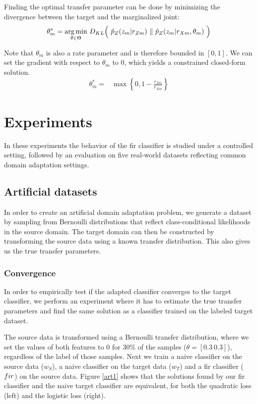 \documentclass[twoside,11pt]{article}
\begin{document}
Finding the optimal transfer parameter can be done by minimizing the divergence between the target and the marginalized joint: 
\begin{align}
	{\bf \theta}_{m}^{*} = \underset{\theta \in \Theta}{\arg \min} \ D_{KL}\Big( \ \hat{p}_{Z}(z_m|r_{Zm}) \ \|\ \hat{p}_{Z}(z_m|r_{Xm}, \theta_m) \ \Big) \nonumber
\end{align}

Note that $\theta_m$ is also a rate parameter and is therefore bounded in $[0,1]$. We can set the gradient with respect to $\theta_m$ to 0, which yields a constrained closed-form solution.
\begin{align}
	\theta_{m}^{*} =& \max \left\{0, 1-\frac{r_{Zm}}{r_{Xm}} \label{theta_star} \right\}
\end{align}

\section{Experiments}
In these experiments the behavior of the {\sc fir} classifier is studied under a controlled setting, followed by an evaluation on five real-world datasets reflecting common domain adaptation settings.

\subsection{Artificial datasets}
In order to create an artificial domain adaptation problem, we generate a dataset by sampling from Bernoulli distributions that reflect class-conditional likelihoods in the source domain. The target domain can then be constructed by transforming the source data using a known transfer distribution. This also gives us the true transfer parameters.

\subsubsection{Convergence}
In order to empirically test if the adapted classifier converges to the target classifier, we perform an experiment where it has to estimate the true transfer parameters and find the same solution as a classifier trained on the labeled target dataset.

The source data is transformed using a Bernoulli transfer distribution, where we set the values of both features to 0 for 30\% of the samples ($\theta= [0.3 \ 0.3]$), regardless of the label of those samples. Next we train a naive classifier on the source data ($w_{S}$), a naive classifier on the target data ($w_{T}$) and a {\sc fir} classifier (${\sc fir}$) on the source data. Figure \ref{art1} shows that the solutions found by our {\sc fir} classifier and the naive target classifier are equivalent, for both the quadratic loss (left) and the logistic loss (right).
\end{document}
